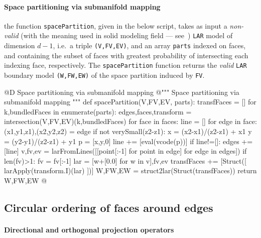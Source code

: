 \documentclass[11pt,oneside]{article}    %
\begin{document}
    

\paragraph{Space partitioning via submanifold mapping}

the function \texttt{spacePartition}, given in the below script, takes as input a \emph{non-valid} (with the meaning used in solid modeling field --- see~\cite{Requicha:1980:RRS:356827.356833}) \texttt{LAR} model of dimension $d-1$, i.e.~a triple \texttt{(V,FV,EV)}, and an array \texttt{parts} indexed on faces, and containing the subset of faces with greatest probability of intersecting each indexing face, respectively. The \texttt{spacePartition} function returns the \emph{valid} \texttt{LAR} boundary model \texttt{(W,FW,EW)} of the space partition induced by \texttt{FV}.
 
@D Space partitioning via submanifold mapping
@{""" Space partitioning via submanifold mapping """
def spacePartition(V,FV,EV, parts):
    transfFaces = []
    for k,bundledFaces in enumerate(parts):
        edges,faces,transform = intersection(V,FV,EV)(k,bundledFaces)
        for face in faces:
            line = []
            for edge in face:
                (x1,y1,z1),(x2,y2,z2) = edge
                if not verySmall(z2-z1):
                    x = (x2-x1)/(z2-z1) + x1
                    y = (y2-y1)/(z2-z1) + y1
                    p = [x,y,0]
                    line += [eval(vcode(p))]
            if line!=[]: edges += [line]
        v,fv,ev = larFromLines([[point[:-1] for point in edge] for edge in edges])    
        if len(fv)>1: fv = fv[:-1]
        lar = [w+[0.0] for w in v],fv,ev
        transfFaces += [Struct([ larApply(transform.I)(lar) ])]
    W,FW,EW = struct2lar(Struct(transfFaces))
    return W,FW,EW
@}


\subsection{Circular ordering of faces around edges}


\paragraph{Directional and orthogonal projection operators}
\end{document}
